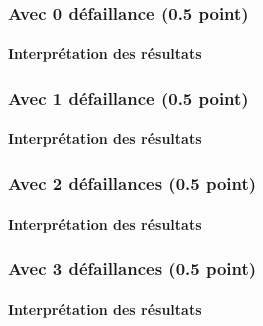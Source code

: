 \documentclass[a4paper]{book}
\begin{document}
\subsubsection{Avec 0 défaillance (0.5 point)}



%
%
\paragraph{Interprétation des résultats}

\subsubsection{Avec 1 défaillance (0.5 point)}




%
\paragraph{Interprétation des résultats}

\subsubsection{Avec 2 défaillances (0.5 point)}





\paragraph{Interprétation des résultats}

\subsubsection{Avec 3 défaillances (0.5 point)}




%
\paragraph{Interprétation des résultats}
\end{document}
